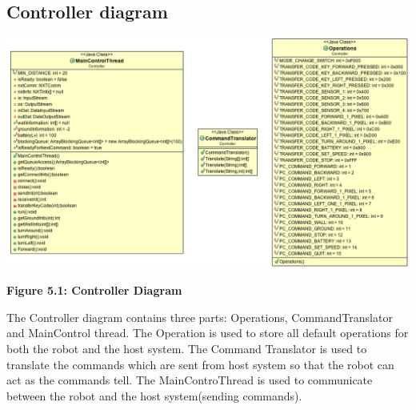 \documentclass[11pt, a4paper]{report}
\begin{document}
\subsection{Controller diagram}
 \begin{center}
 \includegraphics[width=18.20cm]{Controller.png}
\end{center}
\begin{center}
\textbf {Figure 5.1: Controller Diagram} \\[0.3cm]
\end{center}
The Controller diagram contains three parts: Operations, CommandTranslator and MainControl thread. The Operation is used to store all default operations for both the robot and the host system. The Command Translator is used to translate the commands which are sent from host system so that the robot can act as the commands tell. The MainControThread is used to communicate between the robot and the host system(sending commands).
\pagebreak
\end{document}
